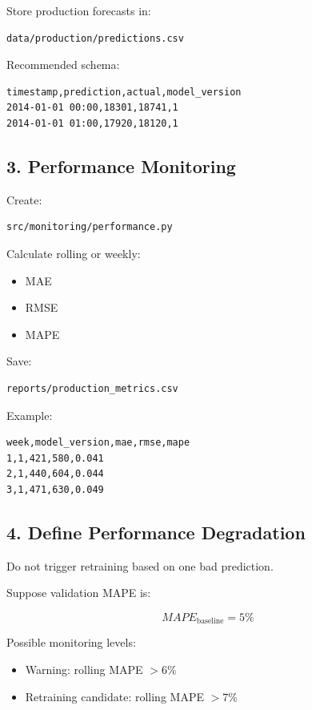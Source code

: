 \documentclass[11pt,a4paper]{article}
\begin{document}
Store production forecasts in:

\begin{lstlisting}
data/production/predictions.csv
\end{lstlisting}

Recommended schema:

\begin{lstlisting}
timestamp,prediction,actual,model_version
2014-01-01 00:00,18301,18741,1
2014-01-01 01:00,17920,18120,1
\end{lstlisting}

\subsection{3. Performance Monitoring}

Create:

\begin{lstlisting}
src/monitoring/performance.py
\end{lstlisting}

Calculate rolling or weekly:

\begin{itemize}
    \item MAE
    \item RMSE
    \item MAPE
\end{itemize}

Save:

\begin{lstlisting}
reports/production_metrics.csv
\end{lstlisting}

Example:

\begin{lstlisting}
week,model_version,mae,rmse,mape
1,1,421,580,0.041
2,1,440,604,0.044
3,1,471,630,0.049
\end{lstlisting}

\subsection{4. Define Performance Degradation}

Do not trigger retraining based on one bad prediction.

Suppose validation MAPE is:

\[
MAPE_{\text{baseline}} = 5\%
\]

Possible monitoring levels:

\begin{itemize}
    \item Warning: rolling MAPE $> 6\%$
    \item Retraining candidate: rolling MAPE $> 7\%$
\end{itemize}
\end{document}
